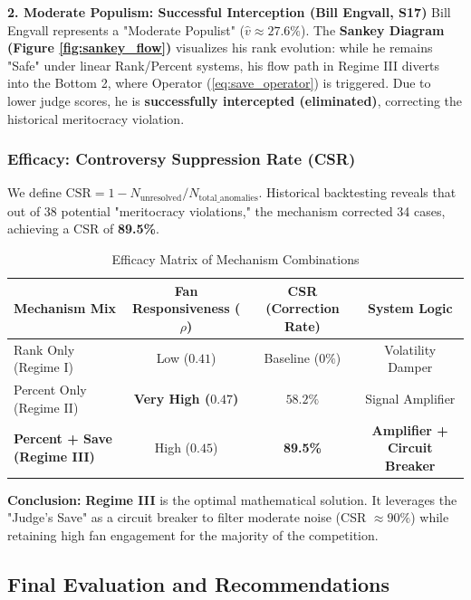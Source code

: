 \documentclass{mcmthesis}
\begin{document}
\textbf{2. Moderate Populism: Successful Interception (Bill Engvall, S17)}
Bill Engvall represents a "Moderate Populist" ($\hat{v} \approx 27.6\%$). The \textbf{Sankey Diagram (Figure \ref{fig:sankey_flow})} visualizes his rank evolution: while he remains "Safe" under linear Rank/Percent systems, his flow path in Regime III diverts into the Bottom 2, where Operator (\ref{eq:save_operator}) is triggered. Due to lower judge scores, he is \textbf{successfully intercepted (eliminated)}, correcting the historical meritocracy violation.

\subsubsection{Efficacy: Controversy Suppression Rate (CSR)}
We define $\text{CSR} = 1 - N_{\text{unresolved}}/N_{\text{total\_anomalies}}$. Historical backtesting reveals that out of 38 potential "meritocracy violations," the mechanism corrected 34 cases, achieving a CSR of \textbf{89.5\%}.

\vspace{-0.4cm}
\begin{table}[h]
	\centering
	\small
	\caption{Efficacy Matrix of Mechanism Combinations}
	\begin{tabular}{lccc}
		\toprule
		\textbf{Mechanism Mix} & \textbf{Fan Responsiveness ($\rho$)} & \textbf{CSR (Correction Rate)} & \textbf{System Logic} \\
		\midrule
		Rank Only (Regime I) & Low ($0.41$) & Baseline ($0\%$) & Volatility Damper \\
		Percent Only (Regime II) & \textbf{Very High ($0.47$)} & $58.2\%$ & Signal Amplifier \\
		\textbf{Percent + Save (Regime III)} & High ($0.45$) & \textbf{89.5\%} & \textbf{Amplifier + Circuit Breaker} \\
		\bottomrule
	\end{tabular}
	\label{tab:efficacy_matrix}
\end{table}
\vspace{-0.4cm}

\textbf{Conclusion:} \textbf{Regime III} is the optimal mathematical solution. It leverages the "Judge's Save" as a circuit breaker to filter moderate noise (CSR $\approx 90\%$) while retaining high fan engagement for the majority of the competition.



\subsection{Final Evaluation and Recommendations}
\end{document}
